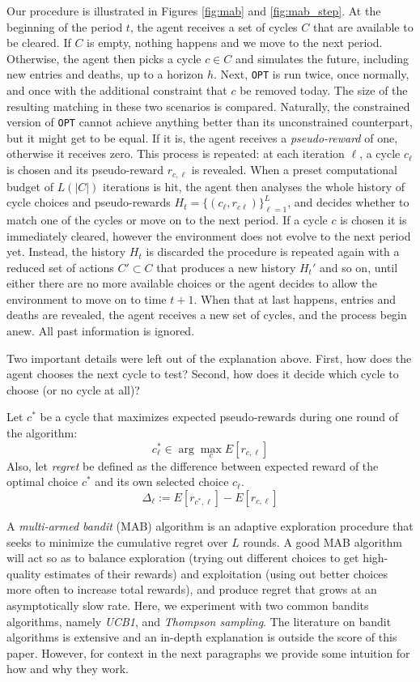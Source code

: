 Our procedure is illustrated in Figures \ref{fig:mab} and \ref{fig:mab_step}. At the beginning of the period $t$, the agent receives a set of cycles $C$ that are available to be cleared. If $C$ is empty, nothing happens and we move to the next period. Otherwise, the agent then picks a cycle $c \in C$ and simulates the future, including new entries and deaths, up to a horizon $h$. Next, \texttt{OPT} is run twice, once normally, and once with the additional constraint that $c$ be removed today. The size of the resulting matching in these two scenarios is compared. Naturally, the constrained version of \texttt{OPT} cannot achieve anything better than its unconstrained counterpart, but it might get to be equal. If it is, the agent receives a \emph{pseudo-reward} of one, otherwise it receives zero. This process is repeated: at each iteration $\ell$, a cycle $c_{\ell}$ is chosen and its pseudo-reward $r_{c, \ell}$ is revealed. When a preset computational budget of $L(|C|)$ iterations is hit, the agent then analyses the whole history of cycle choices and pseudo-rewards $H_{t} = \{ (c_{\ell}, r_{c\ell} ) \}_{\ell=1}^{L}$, and decides whether to match one of the cycles or move on to the next period. If a cycle $c$ is chosen it is immediately cleared, however the environment does not evolve to the next period yet. Instead, the history $H_t$ is discarded the procedure is repeated again with a reduced set of actions $C' \subset C$ that produces a new history $H_t'$ and so on, until either there are no more available choices or the agent decides to allow the environment to move on to time $t+1$. When that at last happens, entries and deaths are revealed, the agent receives a new set of cycles, and the process begin anew. All past information is ignored.


Two important details were left out of the explanation above. First, how does the agent chooses the next cycle to test? Second, how does it decide which cycle to choose (or no cycle at all)? 

Let $c^{*}$ be a cycle that maximizes expected pseudo-rewards during one round of the algorithm:
$$c_{\ell}^{*} \in \arg\max_{c} E[r_{c,\ell}] $$
 Also, let \emph{regret} be defined as the difference between expected reward of the optimal choice $c^*$ and its own selected choice $c_{\ell}$.
 $$\Delta_\ell := E[r_{c^{*},\ell}] - E[r_{c,\ell}]$$
 
 A \emph{multi-armed bandit} (MAB) algorithm is an adaptive exploration procedure that seeks to minimize the cumulative regret over $L$ rounds. A good MAB algorithm will act so as to balance exploration (trying out different choices to get high-quality estimates of their rewards) and exploitation (using out better choices more often to increase total rewards), and produce regret that grows at an asymptotically slow rate. Here, we experiment with two common bandits algorithms, namely \emph{UCB1}, and \emph{Thompson sampling}. The literature on bandit algorithms is extensive and an in-depth explanation is outside the score of this paper. However, for context in the next paragraphs we provide some intuition for how and why they work.
 
